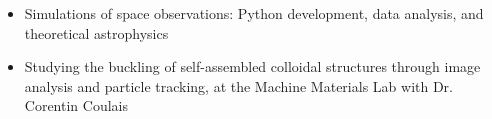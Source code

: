 \documentclass[10pt,a4paper]{altacv}
\begin{document}

\begin{itemize}
\item Simulations of space observations: Python development, data analysis, and theoretical astrophysics
\end{itemize}
\divider


\begin{itemize}
\item Studying the buckling of self-assembled colloidal structures through image analysis and particle tracking, at the Machine Materials Lab with Dr. Corentin Coulais
\end{itemize}
\end{document}
